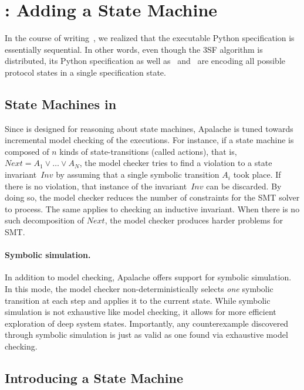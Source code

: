 
\section{\SpecThree{}: Adding a State Machine}\label{sec:spec3}

In the course of writing~\SpecTwo{}, we realized
that the executable Python specification is essentially sequential. In other
words, even though the 3SF algorithm is distributed, its Python
specification as well as~\SpecOne{} and~\SpecTwo{} are encoding
all possible protocol states in a single specification state.

\subsection{State Machines in \tlap{}}

Since \tlap{} is designed for reasoning about state machines, Apalache is tuned
towards incremental model checking of the executions. For instance, if a state
machine is composed of $n$ kinds of state-transitions (called actions), that
is, $\mathit{Next} = A_1 \vee \dots \vee A_N$, the model checker tries to find
a violation to a state invariant~$\textit{Inv}$ by assuming that a single
symbolic transition $A_i$ took place. If there is no violation, that instance
of the invariant~$\textit{Inv}$ can be discarded. By doing so, the model
checker reduces the number of constraints for the SMT solver to process.  The
same applies to checking an inductive invariant. When there is no such
decomposition of $\mathit{Next}$, the model checker produces harder problems
for SMT\@.

\paragraph{Symbolic simulation.} In addition to model checking, Apalache offers
support for symbolic simulation. In this mode, the model checker
non-deterministically selects \emph{one} symbolic transition at each step and
applies it to the current state. While symbolic simulation is not exhaustive
like model checking, it allows for more efficient exploration of deep system
states. Importantly, any counterexample discovered through symbolic simulation
is just as valid as one found via exhaustive model checking.

\subsection{Introducing a State Machine}

